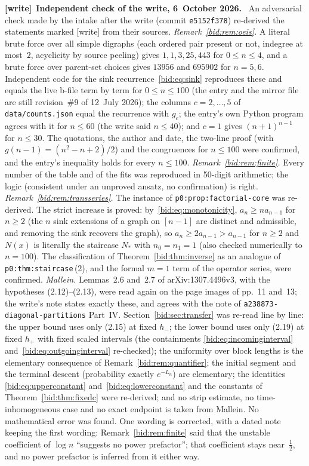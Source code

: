 \documentclass[11pt,letterpaper]{article}
\numberwithin{equation}{section}
\theoremstyle{remark}\newtheorem{remark}[theorem]{Remark}
\newcommand{\file}[1]{\nolinkurl{#1}}
\newenvironment{writenote}[1][]{\par\smallskip\begingroup\small
 \noindent\textbf{[write]}\if\relax\detokenize{#1}\relax\else~\textbf{#1.}\fi\ }%
 {\par\endgroup\smallskip}
\begin{document}
\begin{writenote}[Independent check of the write, 6~October 2026]
An adversarial check made by the intake after the write (commit
\file{e5152f378}) re-derived the statements marked [write] from their sources.
\emph{Remark~\ref{bid:rem:oeis}.} A literal brute force over all simple
digraphs (each ordered pair present or not, indegree at most~$2$, acyclicity
by source peeling) gives $1,1,3,25,443$ for $0\le n\le4$, and a brute force
over parent-set choices gives $13956$ and $695902$ for $n=5,6$. Independent
code for the sink recurrence~\eqref{bid:eq:sink} reproduces these and equals
the live b-file term by term for $0\le n\le100$ (the entry and the mirror file
are still revision~\#9 of 12~July 2026); the columns $c=2,\dots,5$ of
\file{data/counts.json} equal the recurrence with $g_c$; the entry's own Python
program agrees with it for $n\le60$ (the write said $n\le40$); and $c=1$ gives
$(n+1)^{n-1}$ for $n\le30$. The quotations, the author and date, the
two-line proof (with $g(n-1)=(n^2-n+2)/2$) and the congruences for $n\le100$
were confirmed, and the entry's inequality holds for every $n\le100$.
\emph{Remark~\ref{bid:rem:finite}.} Every number of the table and of the fits
was reproduced in 50-digit arithmetic; the logic (consistent under an unproved
ansatz, no confirmation) is right. \emph{Remark~\ref{bid:rem:transseries}.}
The instance of \file{p0:prop:factorial-core} was re-derived. The strict
increase is proved: by~\eqref{bid:eq:monotonicity}, $a_n\ge na_{n-1}$ for
$n\ge2$ (the $n$ sink extensions of a graph on $[n-1]$ are distinct and
admissible, and removing the sink recovers the graph), so
$a_n\ge2a_{n-1}>a_{n-1}$ for $n\ge2$ and $N(x)$ is literally the staircase
$N_\ast$ with $n_0=n_1=1$ (also checked numerically to $n=100$). The
classification of Theorem~\ref{bid:thm:inverse} as an analogue of
\file{p0:thm:staircase}\,(2), and the formal $m=1$ term of the operator
series, were confirmed. \emph{Mallein.} Lemmas~2.6 and~2.7 of
arXiv:1307.4496v3, with the hypotheses (2.12)--(2.13), were read again on the
page images of pp.~11 and~13; the write's note states exactly these, and
agrees with the note of \file{a238873-diagonal-partitions} Part~IV.
Section~\ref{bid:sec:transfer} was re-read line by line: the upper bound uses
only (2.15) at fixed $h_-$; the lower bound uses only (2.19) at fixed $h_+$ with
fixed scaled intervals (the containments \eqref{bid:eq:incominginterval}
and~\eqref{bid:eq:outgoinginterval} re-checked); the uniformity over block
lengths is the elementary consequence of Remark~\ref{bid:rem:quantifier}; the
initial segment and the terminal descent (probability exactly $e^{-L_n}$) are
elementary; the identities \eqref{bid:eq:upperconstant}
and~\eqref{bid:eq:lowerconstant} and the constants of
Theorem~\ref{bid:thm:fixedc} were re-derived; and no strip estimate, no
time-inhomogeneous case and no exact endpoint is taken from Mallein. No
mathematical error was found. One wording is corrected, with a dated note
keeping the first wording: Remark~\ref{bid:rem:finite} said that the unstable
coefficient of $\log n$ ``suggests no power prefactor''; that coefficient stays
near~$\frac12$, and no power prefactor is inferred from it either way.
\end{writenote}
\end{document}
